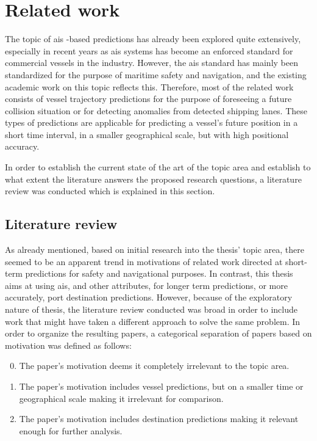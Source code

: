\chapter{Related work}

The topic of \acrfull{ais} -based predictions has already been explored quite extensively, especially in recent years as \acrshort{ais} systems has become an enforced standard for commercial vessels in the industry. However, the \acrshort{ais} standard has mainly been standardized for the purpose of maritime safety and navigation, and the existing academic work on this topic reflects this. Therefore, most of the related work consists of vessel trajectory predictions for the purpose of foreseeing a future collision situation or for detecting anomalies from detected shipping lanes. These types of predictions are applicable for predicting a vessel's future position in a short time interval, in a smaller geographical scale, but with high positional accuracy.

In order to establish the current state of the art of the topic area and establish to what extent the literature answers the proposed research questions, a literature review was conducted which is explained in this section.

\section{Literature review}
\label{sec:lit_review}

As already mentioned, based on initial research into the thesis' topic area, there seemed to be an apparent trend in motivations of related work directed at short-term predictions for safety and navigational purposes. In contrast, this thesis aims at using \acrshort{ais}, and other attributes, for longer term predictions, or more accurately, port destination predictions. However, because of the exploratory nature of thesis, the literature review conducted was broad in order to include work that might have taken a different approach to solve the same problem. In order to organize the resulting papers, a categorical separation of papers based on motivation was defined as follows:

\begin{enumerate}
\setcounter{enumi}{-1}
    \item The paper's motivation deems it completely irrelevant to the topic area.
    \item The paper's motivation includes vessel predictions, but on a smaller time or geographical scale making it irrelevant for comparison.
    \item The paper's motivation includes destination predictions making it relevant enough for further analysis.
\end{enumerate}

